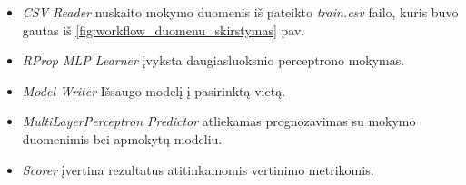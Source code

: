 \begin{itemize}
    \item \textit{CSV Reader} nuskaito mokymo duomenis iš pateikto \textit{train.csv} failo, kuris buvo gautas iš \ref{fig:workflow_duomenu_skirstymas} pav.
    \item \textit{RProp MLP Learner} įvyksta daugiasluoksnio perceptrono mokymas.
    \item \textit{Model Writer} Išsaugo modelį į pasirinktą vietą.
    \item \textit{MultiLayerPerceptron Predictor} atliekamas prognozavimas su mokymo duomenimis bei apmokytų modeliu.
    \item \textit{Scorer} įvertina rezultatus atitinkamomis vertinimo metrikomis.
\end{itemize}